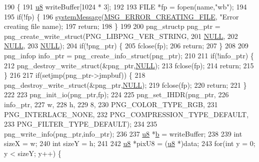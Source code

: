 \begin{DoxyCode}
190 \{
191   \mbox{\hyperlink{_system_8h_aed742c436da53c1080638ce6ef7d13de}{u8}} writeBuffer[1024 * 3];
192   
193   FILE *fp = fopen(name,\textcolor{stringliteral}{"wb"});
194 
195   \textcolor{keywordflow}{if}(!fp) \{
196     \mbox{\hyperlink{system_8cpp_a747a9cb8e015a3d45cca636b5bd0fc69}{systemMessage}}(\mbox{\hyperlink{_n_l_s_8h_a165f1f2539e202f0a24e6e9583c63475}{MSG\_ERROR\_CREATING\_FILE}}, \textcolor{stringliteral}{"Error creating file %
      name);
197     \textcolor{keywordflow}{return};
198   \}
199   
200   png\_structp png\_ptr = png\_create\_write\_struct(PNG\_LIBPNG\_VER\_STRING,
201                                                 \mbox{\hyperlink{getopt1_8c_a070d2ce7b6bb7e5c05602aa8c308d0c4}{NULL}},
202                                                 \mbox{\hyperlink{getopt1_8c_a070d2ce7b6bb7e5c05602aa8c308d0c4}{NULL}},
203                                                 \mbox{\hyperlink{getopt1_8c_a070d2ce7b6bb7e5c05602aa8c308d0c4}{NULL}});
204   \textcolor{keywordflow}{if}(!png\_ptr) \{
205     fclose(fp);
206     \textcolor{keywordflow}{return};
207   \}
208 
209   png\_infop info\_ptr = png\_create\_info\_struct(png\_ptr);
210 
211   \textcolor{keywordflow}{if}(!info\_ptr) \{
212     png\_destroy\_write\_struct(&png\_ptr,\mbox{\hyperlink{getopt1_8c_a070d2ce7b6bb7e5c05602aa8c308d0c4}{NULL}});
213     fclose(fp);
214     \textcolor{keywordflow}{return};
215   \}
216 
217   \textcolor{keywordflow}{if}(setjmp(png\_ptr->jmpbuf)) \{
218     png\_destroy\_write\_struct(&png\_ptr,\mbox{\hyperlink{getopt1_8c_a070d2ce7b6bb7e5c05602aa8c308d0c4}{NULL}});
219     fclose(fp);
220     \textcolor{keywordflow}{return};
221   \}
222 
223   png\_init\_io(png\_ptr,fp);
224 
225   png\_set\_IHDR(png\_ptr,
226                info\_ptr,
227                w,
228                h,
229                8,
230                PNG\_COLOR\_TYPE\_RGB,
231                PNG\_INTERLACE\_NONE,
232                PNG\_COMPRESSION\_TYPE\_DEFAULT,
233                PNG\_FILTER\_TYPE\_DEFAULT);
234 
235   png\_write\_info(png\_ptr,info\_ptr);
236 
237   \mbox{\hyperlink{_system_8h_aed742c436da53c1080638ce6ef7d13de}{u8}} *\mbox{\hyperlink{expr-lex_8cpp_a91b64995742fd30063314f12340b4b5a}{b}} = writeBuffer;
238 
239   \textcolor{keywordtype}{int} sizeX = w;
240   \textcolor{keywordtype}{int} sizeY = h;
241 
242   \mbox{\hyperlink{_system_8h_aed742c436da53c1080638ce6ef7d13de}{u8}} *pixU8 = (\mbox{\hyperlink{_system_8h_aed742c436da53c1080638ce6ef7d13de}{u8}} *)data;
243   \textcolor{keywordflow}{for}(\textcolor{keywordtype}{int} y = 0; y < sizeY; y++) \{
}
\end{DoxyCode}
